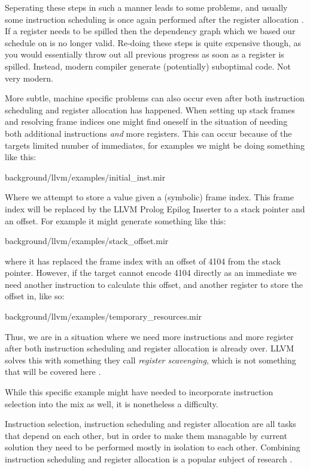 Seperating these steps in such a manner leads to some problems, and usually some instruction
scheduling is once again performed after the register allocation \cite{welcome-to-backend}.
If a register needs to be spilled then the dependency graph which we based our schedule on is no longer valid. Re-doing
these steps is quite expensive though, as you would essentially throw out all previous
progress as soon as a register is spilled. Instead, modern compiler generate (potentially)
suboptimal code. Not very modern.

More subtle, machine specific problems can also occur even after both instruction scheduling
and register allocation has happened. When setting up stack frames and resolving frame
indices one might find oneself in the situation of needing both additional instructions
\textit{and} more registers. This can occur because of the targets limited number of immediates,
for examples we might be doing something like this:


{background/llvm/examples/initial_inst.mir}

Where we attempt to store a value given a (symbolic) frame index. This frame index will be replaced by
the LLVM Prolog Epilog Inserter to a stack pointer and an offset. For example it might
generate something like this:


{background/llvm/examples/stack_offset.mir}

where it has replaced the frame index with an offset of 4104 from the stack pointer. However,
if the target cannot encode 4104 directly as an immediate we need another instruction to
calculate this offset, and another register to store the offset in, like so:


{background/llvm/examples/temporary_resources.mir}

Thus, we are in a situation where we need more instructions and more register after both
instruction scheduling and register allocation is already over. LLVM solves this with something
they call \textit{register scavenging}, which is not something that will be covered here
\cite[at~48:53]{welcome-to-backend}.

While this specific example might have needed to incorporate instruction selection into
the mix as well, it is nonetheless a difficulty.

Instruction selection, instruction scheduling and register allocation are all tasks that
depend on each other, but in order to make them managable by current solution they need
to be performed mostly in isolation to each other. Combining instruction scheduling and
register allocation is a popular subject of research
\cite{constraint-based, combining-alloc-sched, integrated-sched-alloc-techniques}.
